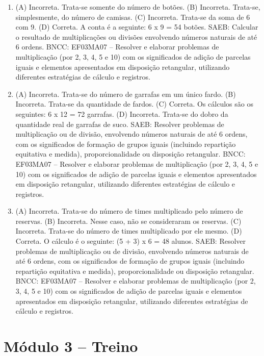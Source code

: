 \begin{enumerate}
\item
(A) Incorreta. Trata-se somente do número de botões.
(B) Incorreta. Trata-se, simplesmente, do número de camisas.
(C) Incorreta. Trata-se da soma de 6 com 9.
(D) Correta. A conta é a seguinte: 6 x 9 = 54 botões.
SAEB: Calcular o resultado de multiplicações ou divisões envolvendo números naturais de até 6 ordens.
BNCC: EF03MA07 – Resolver e elaborar problemas de multiplicação (por 2, 3, 4, 5 e 10) com os
significados de adição de parcelas iguais e elementos apresentados em disposição retangular,
utilizando diferentes estratégias de cálculo e registros.

\item
(A) Incorreta. Trata-se do número de garrafas em um único fardo.
(B) Incorreta. Trata-se da quantidade de fardos.
(C) Correta. Os cálculos são os seguintes: 6 x 12 = 72 garrafas.
(D) Incorreta. Trata-se do dobro da quantidade real de garrafas de suco.
SAEB: Resolver problemas de multiplicação ou de divisão, envolvendo números naturais de até 6 ordens, com os significados de formação de grupos iguais (incluindo repartição equitativa e medida), proporcionalidade ou disposição retangular.
BNCC: EF03MA07 – Resolver e elaborar problemas de multiplicação (por 2, 3, 4, 5 e 10) com os
significados de adição de parcelas iguais e elementos apresentados em disposição retangular,
utilizando diferentes estratégias de cálculo e registros.

\item
(A) Incorreta. Trata-se do número de times multiplicado pelo número de reservas.
(B) Incorreta. Nesse caso, não se consideraram os reservas.
(C) Incorreta. Trata-se do número de times multiplicado por ele mesmo.
(D) Correta. O cálculo é o seguinte: (5 + 3) x 6 = 48 alunos.
SAEB: Resolver problemas de multiplicação ou de divisão, envolvendo números naturais de até 6 ordens, com os significados de formação de grupos iguais (incluindo repartição equitativa e medida), proporcionalidade ou disposição retangular.
BNCC: EF03MA07 – Resolver e elaborar problemas de multiplicação (por 2, 3, 4, 5 e 10) com os
significados de adição de parcelas iguais e elementos apresentados em disposição retangular,
utilizando diferentes estratégias de cálculo e registros.
\end{enumerate}

\section*{Módulo 3 -- Treino}

